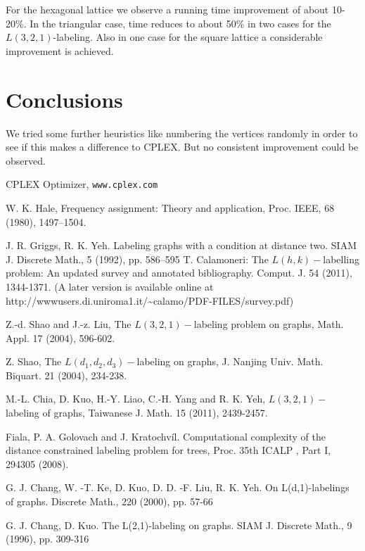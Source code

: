 \documentclass[smallextended]{svjour3}
\begin{document}
For the hexagonal lattice we observe a running time improvement of about 10-20\%.
In the triangular case, time reduces to about 50\% in two cases for the $L(3,2,1)$-labeling.
Also in one case for the square lattice a considerable improvement is achieved.

\section{Conclusions}

We tried some further heuristics like numbering the vertices randomly in order
to see if this makes a difference to CPLEX. But no consistent improvement
could be observed.

\begin{thebibliography}{1}
CPLEX Optimizer, \texttt{www.cplex.com}

W. K. Hale, Frequency assignment: Theory and application,
Proc. IEEE, 68 (1980), 1497--1504.

J. R. Griggs, R. K. Yeh. Labeling graphs with a condition
at distance two. SIAM J. Discrete Math., 5 (1992), pp. 586--595
T. Calamoneri: The $L(h,k)-$labelling problem:
An updated survey and annotated bibliography. Comput. J. 54 (2011),
1344-1371. (A later version is available online at http://wwwusers.di.uniroma1.it/\textasciitilde{}calamo/PDF-FILES/survey.pdf)


Z.-d. Shao and J.-z. Liu, The $L(3,2,1)-$labeling
problem on graphs, Math. Appl. 17 (2004), 596-602.


Z. Shao, The $L(d_{1},d_{2},d_{3})-$labeling on
graphs, J. Nanjing Univ. Math. Biquart. 21 (2004), 234-238.



M.-L. Chia, D. Kuo, H.-Y. Liao, C.-H. Yang and R.
K. Yeh, $L(3,2,1)-$labeling of graphs, Taiwanese J. Math. 15 (2011),
2439-2457.



 Fiala, P. A. Golovach and J. Kratochvíl. Computational
complexity of the distance constrained labeling problem for trees,
Proc. 35th ICALP , Part I, 294\textendash{}305 (2008). 



G. J. Chang, W. -T. Ke, D. Kuo, D. D. -F. Liu, R.
K. Yeh. On L(d,1)-labelings of graphs. Discrete Math., 220 (2000),
pp. 57-66



G. J. Chang, D. Kuo. The L(2,1)-labeling on graphs.
SIAM J. Discrete Math., 9 (1996), pp. 309-316


\end{thebibliography}
\end{document}
